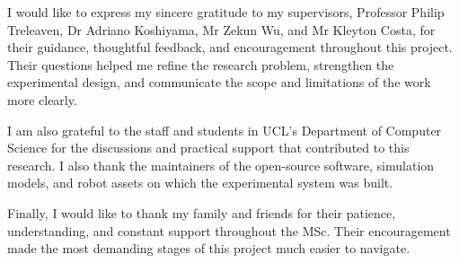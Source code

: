 \begin{acknowledgements}
I would like to express my sincere gratitude to my supervisors,
Professor Philip Treleaven, Dr Adriano Koshiyama, Mr Zekun Wu, and
Mr Kleyton Costa, for their guidance, thoughtful feedback, and encouragement
throughout this project. Their questions helped me refine the research problem,
strengthen the experimental design, and communicate the scope and limitations
of the work more clearly.

I am also grateful to the staff and students in UCL's Department of Computer
Science for the discussions and practical support that contributed to this
research. I also thank the maintainers of the open-source software, simulation
models, and robot assets on which the experimental system was built.

Finally, I would like to thank my family and friends for their patience,
understanding, and constant support throughout the MSc. Their encouragement
made the most demanding stages of this project much easier to navigate.
\end{acknowledgements}

\setcounter{tocdepth}{2}

\tableofcontents
\listoffigures
\listoftables
